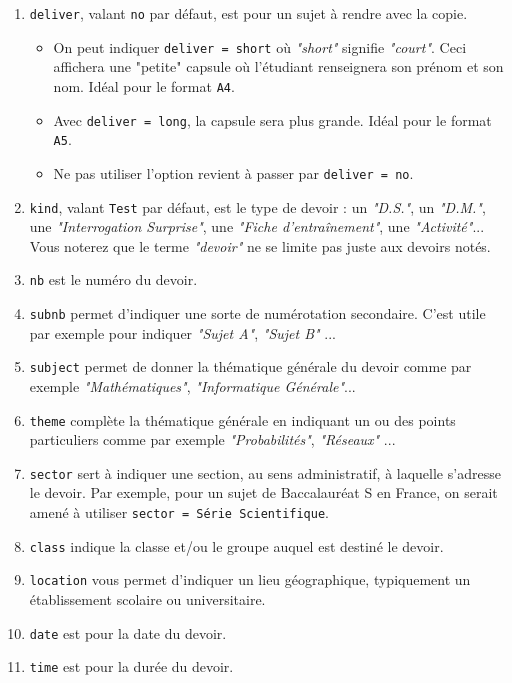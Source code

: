 \documentclass[12pt,a4paper]{scrartcl}
\theoremstyle{definition}
\begin{document}
\begin{enumerate}
    \item \verb+deliver+, valant \verb+no+ par défaut, est pour un sujet à rendre avec la copie.
    \begin{itemize}
        \setlength\itemsep{0em}

        \item On peut indiquer \verb+deliver = short+ où \emph{"short"} signifie \emph{"court"}. Ceci affichera une "petite" capsule où l'étudiant renseignera son prénom et son nom. Idéal pour le format \verb+A4+.

        \item Avec \verb+deliver = long+, la capsule sera plus grande. Idéal pour le format \verb+A5+.

        \item Ne pas utiliser l'option revient à passer par \verb+deliver = no+.
    \end{itemize}

    \item \verb+kind+, valant \verb+Test+ par défaut, est le type de devoir : un \emph{"D.S."}, un \emph{"D.M."}, une \emph{"Interrogation Surprise"}, une \emph{"Fiche d'entraînement"}, une \emph{"Activité"}...
    Vous noterez que le terme \emph{"devoir"} ne se limite pas juste aux devoirs notés.

    \item \verb+nb+ est le numéro du devoir.

    \item \verb+subnb+ permet d'indiquer une sorte de numérotation secondaire. C'est utile par exemple pour indiquer \emph{"Sujet A"}, \emph{"Sujet B"} ...

    \item \verb+subject+ permet de donner la thématique générale du devoir comme par exemple \emph{"Mathématiques"}, \emph{"Informatique Générale"}...

    \item \verb+theme+ complète la thématique générale en indiquant un ou des points particuliers comme par exemple \emph{"Probabilités"}, \emph{"Réseaux"} ...

    \item \verb+sector+ sert à indiquer une section, au sens administratif, à laquelle s'adresse le devoir. Par exemple, pour un sujet de Baccalauréat S en France, on serait amené à utiliser \verb+sector = Série Scientifique+.

    \item \verb+class+ indique la classe et/ou le groupe auquel est destiné le devoir.

    \item \verb+location+ vous permet d'indiquer un lieu géographique, typiquement un établissement scolaire ou universitaire.

    \item \verb+date+ est pour la date du devoir.

    \item \verb+time+ est pour la durée du devoir.
\end{enumerate}
\end{document}
